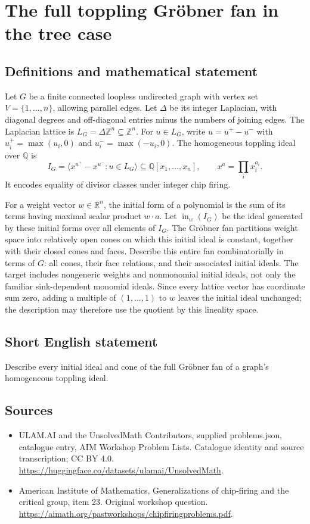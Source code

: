 \documentclass[11pt,a4paper]{article}
\begin{document}
\section*{The full toppling Gröbner fan in the tree case}\label{statement}

\subsection{Definitions and mathematical statement}
Let $G$ be a finite connected loopless undirected graph with vertex set $V=\{1,\ldots,n\}$, allowing parallel edges.
Let $\Delta$ be its integer Laplacian, with diagonal degrees and off-diagonal entries minus the numbers of joining edges.
The Laplacian lattice is $L_G=\Delta\mathbb Z^n\subseteq\mathbb Z^n$.
For $u\in L_G$, write $u=u^+-u^-$ with $u_i^+=\max(u_i,0)$ and $u_i^-=\max(-u_i,0)$.
The homogeneous toppling ideal over $\mathbb Q$ is
\[
 I_G=\langle x^{u^+}-x^{u^-}:u\in L_G\rangle
       \subseteq\mathbb Q[x_1,\ldots,x_n],
 \qquad x^a=\prod_i x_i^{a_i}.
\]
It encodes equality of divisor classes under integer chip firing.

For a weight vector $w\in\mathbb R^n$, the initial form of a polynomial is the sum of its terms having maximal scalar product $w\cdot a$.
Let $\operatorname{in}_w(I_G)$ be the ideal generated by these initial forms over all elements of $I_G$.
The Gröbner fan partitions weight space into relatively open cones on which this initial ideal is constant, together with their closed cones and faces.
Describe this entire fan combinatorially in terms of $G$: all cones, their face relations, and their associated initial ideals.
The target includes nongeneric weights and nonmonomial initial ideals, not only the familiar sink-dependent monomial ideals.
Since every lattice vector has coordinate sum zero, adding a multiple of $(1,\ldots,1)$ to $w$ leaves the initial ideal unchanged; the description may therefore use the quotient by this lineality space.
\subsection{Short English statement}
Describe every initial ideal and cone of the full Gröbner fan of a graph’s homogeneous toppling ideal.
\subsection{Sources}
\begin{itemize}
\item[S1] ULAM.AI and the UnsolvedMath Contributors, supplied problems.json, catalogue entry, AIM Workshop Problem Lists. Catalogue identity and source transcription; CC BY 4.0.
\url{https://huggingface.co/datasets/ulamai/UnsolvedMath}.
\item[S2] American Institute of Mathematics, Generalizations of chip-firing and the critical group, item 23. Original workshop question.
\url{https://aimath.org/pastworkshops/chipfiringproblems.pdf}.
\end{itemize}
\end{document}
